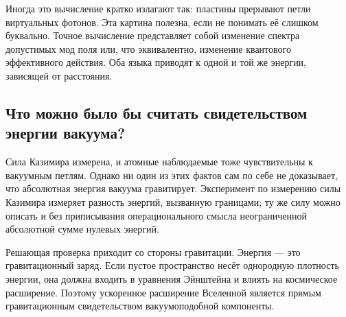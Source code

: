 \begin{classroomqa}
\end{classroomqa}

Иногда это вычисление кратко излагают так: пластины прерывают петли виртуальных фотонов. Эта картина полезна, если не понимать её слишком буквально. Точное вычисление представляет собой изменение спектра допустимых мод поля или, что эквивалентно, изменение квантового эффективного действия. Оба языка приводят к одной и той же энергии, зависящей от расстояния.

\begin{classroomqa}
\end{classroomqa}

\subsection{Что можно было бы считать свидетельством энергии вакуума?}

Сила Казимира измерена, и атомные наблюдаемые тоже чувствительны к вакуумным петлям. Однако ни один из этих фактов сам по себе не доказывает, что абсолютная энергия вакуума гравитирует. Эксперимент по измерению силы Казимира измеряет разность энергий, вызванную границами; ту же силу можно описать и без приписывания операционального смысла неограниченной абсолютной сумме нулевых энергий.

Решающая проверка приходит со стороны гравитации. Энергия — это гравитационный заряд. Если пустое пространство несёт однородную плотность энергии, она должна входить в уравнения Эйнштейна и влиять на космическое расширение. Поэтому ускоренное расширение Вселенной является прямым гравитационным свидетельством вакуумоподобной компоненты.

